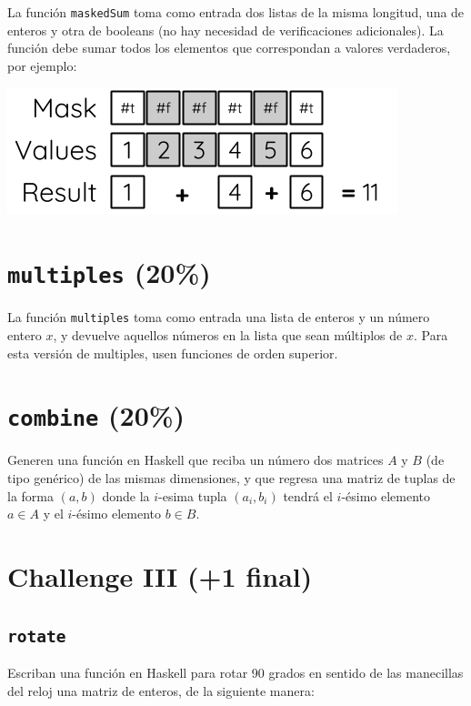 \documentclass[]{article}
\theoremstyle{definition}
\begin{document}
La función \texttt{maskedSum} toma como entrada dos listas de la misma longitud, una de enteros y otra de booleans (no hay necesidad de verificaciones adicionales). La función debe sumar todos los elementos que correspondan a valores verdaderos, por ejemplo:

\begin{center}
	\includegraphics[scale=0.65]{../img/MaskedSum}	
\end{center}

\section{\texttt{multiples} (20\%)}

La función \texttt{multiples} toma como entrada una lista de enteros y un número entero $x$, y devuelve aquellos números en la lista que sean múltiplos de $x$. Para esta versión de multiples, usen funciones de orden superior.

\section{\texttt{combine} (20\%)}

Generen una función en Haskell que reciba un número dos matrices $A$ y $B$ (de tipo genérico) de las mismas dimensiones, y que regresa una matriz de tuplas de la forma $(a, b)$ donde la $i$-esima tupla $(a_i, b_i)$ tendrá el $i$-ésimo elemento $a \in A$ y el $i$-ésimo elemento $b \in B$.

\pagebreak

\section*{Challenge III (+1 final)}

\subsection*{\texttt{rotate}}
Escriban una función en Haskell para rotar 90 grados en sentido de las manecillas del reloj una matriz de enteros, de la siguiente manera:
\end{document}

